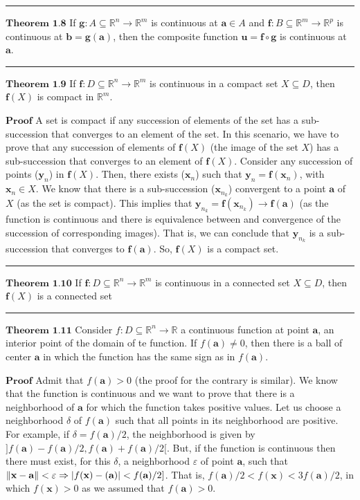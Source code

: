\documentclass[0pt, a4paper]{article}
\begin{document}
\noindent\rule{\textwidth}{1pt}

$\textbf{Theorem 1.8}$ If $\textbf{g}:A\subseteq\mathbb{R}^n\to\mathbb{R}^m$ is continuous at $\textbf{a}\in A$ and $\textbf{f}:B\subseteq\mathbb{R}^m\to\mathbb{R}^p$ is continuous at $\textbf{b}=\textbf{g}(\textbf{a})$, then the composite function $\textbf{u}=\textbf{f}\circ\textbf{g}$ is continuous at $\textbf{a}$.

\noindent\rule{\textwidth}{1pt}

$\textbf{Theorem 1.9}$ If $\textbf{f}:D\subseteq\mathbb{R}^n\to\mathbb{R}^m$ is continuous in a compact set $X\subseteq D$, then $\textbf{f}(X)$ is compact in $\mathbb{R}^m$.

$\textbf{Proof}$ A set is compact if any succession of elements of the set has a sub-succession that converges to an element of the set. In this scenario, we have to prove that any succession of elements of $\textbf{f}(X)$ (the image of the set $X$) has a sub-succession that converges to an element of $\textbf{f}(X)$. Consider any succession of points ($\textbf{y}_n$) in $\textbf{f}(X)$. Then, there exists ($\textbf{x}_n$) such that $\textbf{y}_n=\textbf{f}(\textbf{x}_n)$, with $\textbf{x}_n \in X$. We know that there is a sub-succession ($\textbf{x}_{n_k}$) convergent to a point $\textbf{a}$ of $X$ (as the set is compact). This implies that $\textbf{y}_{n_k}=\textbf{f}(\textbf{x}_{n_k})\to\textbf{f}(\textbf{a})$ (as the function is continuous and there is equivalence between and convergence of the succession of corresponding images). That is, we can conclude that $\textbf{y}_{n_k}$ is a sub-succession that converges to $\textbf{f}(\textbf{a})$. So, $\textbf{f}(X)$ is a compact set.

\noindent\rule{\textwidth}{1pt}

$\textbf{Theorem 1.10}$ If $\textbf{f}:D\subseteq\mathbb{R}^n\to\mathbb{R}^m$ is continuous in a connected set $X\subseteq D$, then $\textbf{f}(X)$ is a connected set

\noindent\rule{\textwidth}{1pt}

$\textbf{Theorem 1.11}$ Consider $f:D\subseteq\mathbb{R}^n\to\mathbb{R}$ a continuous function at point $\textbf{a}$, an interior point of the domain of te function. If $f(\textbf{a})\neq0$, then there is a ball of center $\textbf{a}$ in which the function has the same sign as in $f(\textbf{a})$.

$\textbf{Proof}$ Admit that $f(\textbf{a})>0$ (the proof for the contrary is similar). We know that the function is continuous and we want to prove that there is a neighborhood of $\textbf{a}$ for which the function takes positive values. Let us choose a neighborhood $\delta$ of $f(\textbf{a})$ such that all points in its neighborhood are positive. For example, if $\delta=f(\textbf{a})/2$, the neighborhood is given by $]f(\textbf{a})-f(\textbf{a})/2,f(\textbf{a})+f(\textbf{a})/2[$. But, if the function is continuous then there must exist, for this $\delta$, a neighborhood $\varepsilon$ of point $\textbf{a}$, such that $\norm{\textbf{x}-\textbf{a}}<\varepsilon\Rightarrow\abs{f(\textbf{x})-(\textbf{a})}<f(\textbf{a})/2]$. That is, $f(\textbf{a})/2<f(\textbf{x})<3f(\textbf{a})/2$, in which $f(\textbf{x})>0$ as we assumed that $f(\textbf{a})>0$.
\end{document}
